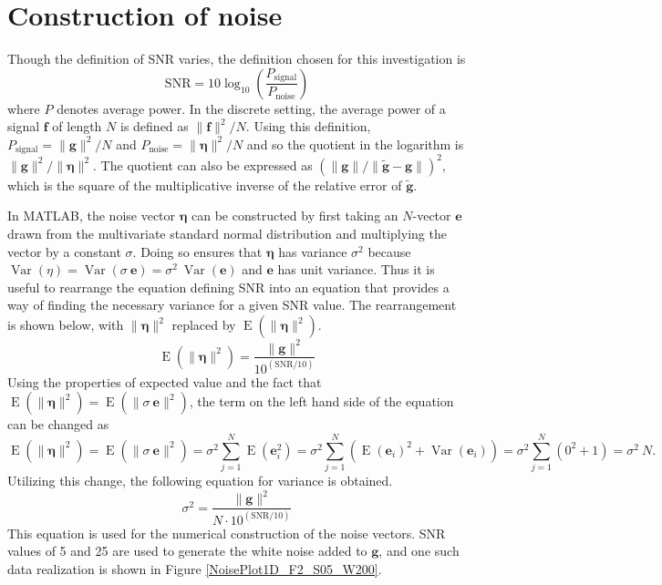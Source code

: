 \documentclass[12pt,notitlepage]{report}
\newcommand{\gVec}{\mathbf{g}}	%
\newcommand{\gnoiseVec}{\widetilde{\mathbf{g}}}	%
\newcommand{\noise}{\eta}	%
\newcommand{\noiseSD}{\sigma}	%
\newcommand{\noiseVec}{\bm{\noise}}	%
\DeclareMathOperator{\Var}{Var}	%
\DeclareMathOperator{\E}{E}	%
\begin{document}
\section{Construction of noise} \label{sec:Construction of noise}

Though the definition of SNR varies, the definition chosen for this investigation is
\begin{equation}
\label{eq:SNR}
\text{SNR} = 10\log_{10}\left(\frac{P_{\text{signal}}}{P_{\text{noise}}}\right)
\end{equation}
where $P$ denotes average power. In the discrete setting, the average power of a signal $\mathbf{f}$ of length $N$ is defined as $\|\mathbf{f}\|^2/N$. Using this definition, $P_{\text{signal}} = \|\gVec\|^2/N$ and $P_{\text{noise}} = \|\noiseVec\|^2/N$ and so the quotient in the logarithm is $\|\gVec\|^2/\|\noiseVec\|^2$. The quotient can also be expressed as $(\|\gVec\|/\|\gnoiseVec - \gVec\|)^2$, which is the square of the multiplicative inverse of the relative error of $\gnoiseVec$. \par
In MATLAB, the noise vector $\noiseVec$ can be constructed by first taking an $N$-vector $\mathbf{e}$ drawn from the multivariate standard normal distribution and multiplying the vector by a constant $\noiseSD$. Doing so ensures that $\noiseVec$ has variance $\noiseSD^2$ because $\Var(\noise) = \Var(\noiseSD\:\mathbf{e}) = \noiseSD^2\:\Var(\mathbf{e})$ and $\mathbf{e}$ has unit variance. Thus it is useful to rearrange the equation defining SNR into an equation that provides a way of finding the necessary variance for a given SNR value. The rearrangement is shown below, with $\|\noiseVec\|^2$ replaced by $\E(\|\noiseVec\|^2)$.
\[\E(\|\noiseVec\|^2) = \frac{\|\gVec\|^2}{10^{(\text{SNR}/10)}}\]
Using the properties of expected value and the fact that $\E(\|\noiseVec\|^2) = \E(\|\noiseSD\:\mathbf{e}\|^2)$, the term on the left hand side of the equation can be changed as
\[\E(\|\noiseVec\|^2) = \E(\|\noiseSD\:\mathbf{e}\|^2) = \noiseSD^2 \sum_{j=1}^N \E(\mathbf{e}_i^2) = \noiseSD^2 \sum_{j=1}^N \left(\E(\mathbf{e}_i)^2 + \Var(\mathbf{e}_i)\right) = \noiseSD^2 \sum_{j=1}^N \left(0^2 + 1\right) = \noiseSD^2\:N.\]
Utilizing this change, the following equation for variance is obtained.
\begin{equation}
\label{eq:Var}
\noiseSD^2 = \frac{\|\gVec\|^2}{N \cdot 10^{(\text{SNR}/10)}}
\end{equation}
This equation is used for the numerical construction of the noise vectors. SNR values of 5 and 25 are used to generate the white noise added to $\gVec$, and one such data realization is shown in Figure \ref{NoisePlot1D_F2_S05_W200}. \par
\end{document}
